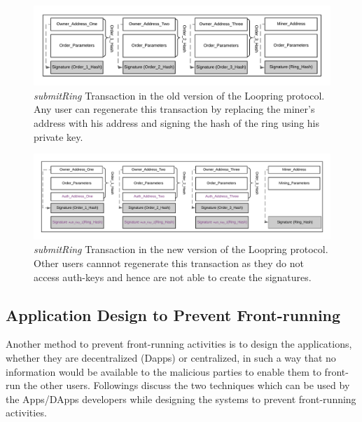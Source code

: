 \begin{figure}[h]
\centering
\includegraphics[width=0.7\linewidth]{figures/Vulnerable_Loopring.png}
\caption{\emph{submitRing} Transaction in the old version of the Loopring protocol. Any user can regenerate this transaction by replacing the miner's address with his address and signing the hash of the ring using his private key. \label{fig:vulnerable_loopring}}
\end{figure}
\begin{figure}[h]
\centering
\includegraphics[width=0.7\linewidth]{figures/Dual_Authoring_Loopring.png}
\caption{\emph{submitRing} Transaction in the new version of the Loopring protocol. Other users cannnot regenerate this transaction as they do not access auth-keys and hence are not able to create the signatures. \label{fig:not_vulnerable_loopring}}
\end{figure}
\subsection{Application Design to Prevent Front-running}

Another method to prevent front-running activities is to design the applications, whether they are decentralized (Dapps) or centralized, in such a way that no information would be available to the malicious parties to enable them to front-run the other users.
Followings discuss the two techniques which can be used by the Apps/DApps developers while designing the systems to prevent front-running activities.

